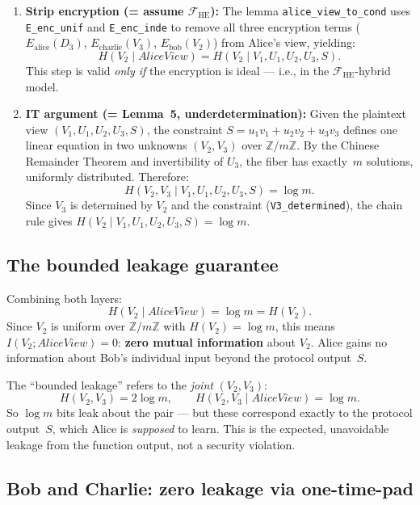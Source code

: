 \documentclass{article}
\begin{document}
\begin{enumerate}
  \item \textbf{Strip encryption (= assume $\mathcal{F}_{\mathrm{HE}}$):}
  The lemma \texttt{alice\_view\_to\_cond} uses \texttt{E\_enc\_unif} and \texttt{E\_enc\_inde} to remove all three encryption terms ($E_{\mathrm{alice}}(D_3)$, $E_{\mathrm{charlie}}(V_3)$, $E_{\mathrm{bob}}(V_2)$) from Alice's view, yielding:
  \[
    H(V_2 \mid \mathit{AliceView}) = H(V_2 \mid V_1, U_1, U_2, U_3, S).
  \]
  This step is valid \emph{only if} the encryption is ideal --- i.e., in the $\mathcal{F}_{\mathrm{HE}}$-hybrid model.

  \item \textbf{IT argument (= Lemma~5, underdetermination):}
  Given the plaintext view $(V_1, U_1, U_2, U_3, S)$, the constraint $S = u_1 v_1 + u_2 v_2 + u_3 v_3$ defines one linear equation in two unknowns $(V_2, V_3)$ over $\mathbb{Z}/m\mathbb{Z}$. By the Chinese Remainder Theorem and invertibility of $U_3$, the fiber has exactly~$m$ solutions, uniformly distributed. Therefore:
  \[
    H(V_2, V_3 \mid V_1, U_1, U_2, U_3, S) = \log m.
  \]
  Since $V_3$ is determined by $V_2$ and the constraint (\texttt{V3\_determined}), the chain rule gives $H(V_2 \mid V_1, U_1, U_2, U_3, S) = \log m$.
\end{enumerate}

\subsection*{The bounded leakage guarantee}

Combining both layers:
\[
  H(V_2 \mid \mathit{AliceView}) = \log m = H(V_2).
\]
Since $V_2$ is uniform over $\mathbb{Z}/m\mathbb{Z}$ with $H(V_2) = \log m$, this means $I(V_2; \mathit{AliceView}) = 0$: \textbf{zero mutual information} about $V_2$. Alice gains no information about Bob's individual input beyond the protocol output~$S$.

The ``bounded leakage'' refers to the \emph{joint} $(V_2, V_3)$:
\[
  H(V_2, V_3) = 2\log m, \qquad H(V_2, V_3 \mid \mathit{AliceView}) = \log m.
\]
So $\log m$ bits leak about the pair --- but these correspond exactly to the protocol output~$S$, which Alice is \emph{supposed} to learn. This is the expected, unavoidable leakage from the function output, not a security violation.

\subsection*{Bob and Charlie: zero leakage via one-time-pad}
\end{document}
